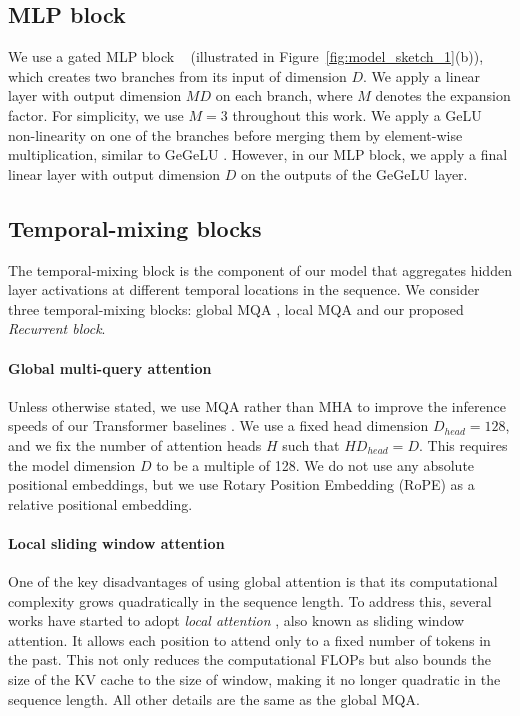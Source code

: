 \documentclass[11pt, a4paper, logo, onecolumn]{googledeepmind}
\theoremstyle{definition}
\newcommand{\subblock}[0]{{block}}
\newcommand{\subblocks}[0]{{blocks}}
\begin{document}
\subsection{MLP \subblock{}}

We use a gated MLP \subblock{} ~\citep{dauphin2017language} (illustrated in Figure~\ref{fig:model_sketch_1}(b)), which
creates two branches from its input of dimension $D$.
We apply a linear layer with output dimension $MD$ on each branch, where $M$ denotes the expansion factor. For simplicity, we use $M=3$ throughout this work. 
We apply a GeLU non-linearity \citep{hendrycks2016gaussian} on one of the branches before merging them 
by element-wise multiplication, similar to GeGeLU \citep{shazeer2020glu}.
However, in our MLP block, we apply a final linear layer with output dimension $D$ on the outputs of the GeGeLU layer. 

\subsection{Temporal-mixing \subblocks{}}

The temporal-mixing \subblock{} is the component of our model that aggregates hidden layer activations at different temporal locations in the sequence. 
We consider three temporal-mixing \subblocks{}: global MQA \citep{shazeer2019fast}, local MQA \citep{beltagy2020longformer} and our proposed \emph{Recurrent \subblock{}}.


\paragraph{Global multi-query attention}

Unless otherwise stated, we use MQA rather than MHA to improve the inference speeds of our Transformer baselines \citep{shazeer2019fast}. 
We use a fixed head dimension $D_{head} = 128$, and we fix the number of attention heads $H$ such that $HD_{head} = D$. This requires the model dimension $D$ to be a multiple of 128.
We do not use any absolute positional embeddings, but we use Rotary Position Embedding (RoPE) \citep{su2021roformer} as a relative positional embedding. 




\paragraph{Local sliding window attention}
\label{sec:local_attention}

One of the key disadvantages of using global attention is that its computational complexity grows quadratically in the sequence length. 
To address this, several works have started to adopt \emph{local attention} \citep{beltagy2020longformer}, also known as sliding window attention. 
It allows each position to attend only to a fixed number of tokens in the past.
This not only reduces the computational FLOPs but also bounds the size of the KV cache to the size of window, making it no longer quadratic in the sequence length.
All other details are the same as the global MQA.
\end{document}
